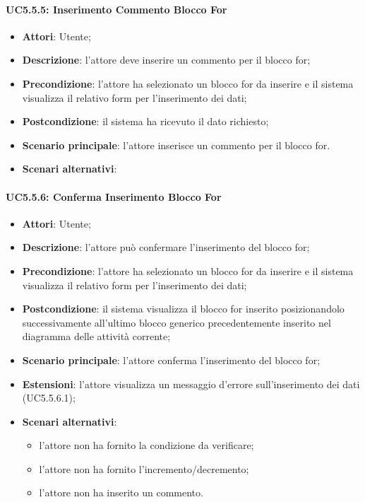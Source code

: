 \paragraph{UC5.5.5: Inserimento Commento Blocco For	}
\label{UC5.5.5}
\begin{itemize}
\item \textbf{Attori}: Utente;
\item \textbf{Descrizione}: l'attore deve inserire un commento per il blocco for;	
\item \textbf{Precondizione}: l'attore ha selezionato un blocco for da inserire e il sistema visualizza il relativo form per l'inserimento dei dati;	
\item \textbf{Postcondizione}: il sistema ha ricevuto il dato richiesto;	
\item \textbf{Scenario principale}:
l'attore inserisce un commento per il blocco for.	
\item \textbf{Scenari alternativi}:
\end{itemize}

\paragraph{UC5.5.6: Conferma Inserimento Blocco For}
\label{UC5.5.6}
\begin{itemize}
\item \textbf{Attori}: Utente;
\item \textbf{Descrizione}: l'attore può confermare l'inserimento del blocco for;	
\item \textbf{Precondizione}: l'attore ha selezionato un blocco for da inserire e il sistema visualizza il relativo form per l'inserimento dei dati;	
\item \textbf{Postcondizione}: il sistema visualizza il blocco for inserito posizionandolo successivamente all'ultimo blocco generico precedentemente inserito nel diagramma delle attività corrente;
\item \textbf{Scenario principale}:
l'attore conferma l'inserimento del blocco for;	
\item \textbf{Estensioni}:
l'attore visualizza un messaggio d'errore sull'inserimento dei dati (UC5.5.6.1);	
\item \textbf{Scenari alternativi}:
\begin{itemize}
\item l'attore non ha fornito la condizione da verificare;
\item l'attore non ha fornito l'incremento/decremento;
\item l'attore non ha inserito un commento.
\end{itemize}
\end{itemize}

